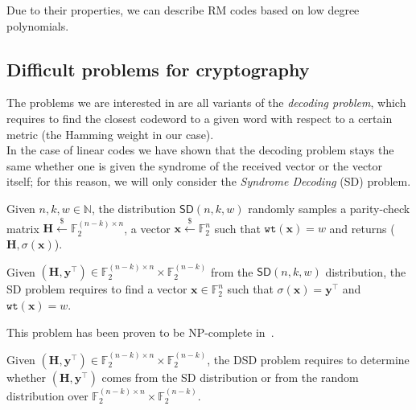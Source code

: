     Due to their properties, we can describe RM codes based on low degree polynomials.\\







\subsection{Difficult problems for cryptography}
The problems we are interested in are all variants of the \textit{decoding problem}, which requires to find 
the closest codeword to a given word with respect to a certain metric (the Hamming weight in our case).\\
In the case of linear codes we have shown that the decoding problem stays the same whether one is given 
the syndrome of the received vector or the vector itself; for this reason, we will only consider 
the \textit{Syndrome Decoding} (\textsf{SD}) problem.\\

\begin{definition}
    Given $n,k,w \in \mathds{N}$, the distribution $\textsf{SD}(n, k, w)$ randomly samples a parity-check matrix 
    $\mathbf{H} \xleftarrow{\mathdollar} \mathds{F}_2^{(n-k)\times n}$, a vector 
    $\mathbf{x} \xleftarrow{\mathdollar} \mathds{F}_2^n$ such that $\texttt{wt}(\mathbf{x}) = w$ 
    and returns ($\mathbf{H}, \sigma(\mathbf{x})$).
\end{definition}

\begin{definition}
    Given $(\mathbf{H}, \mathbf{y}^\top) \in \mathds{F}_2^{(n-k)\times n} \times \mathds{F}_2^{(n-k)}$ from the $\textsf{SD}(n, k, w)$ 
    distribution, the \textsf{SD} problem requires to find a vector $\mathbf{x} \in \mathds{F}_2^n$ such that 
    $\sigma(\mathbf{x}) = \mathbf{y}^\top$ and $\texttt{wt}(\mathbf{x}) = w$.
\end{definition}
This problem has been proven to be NP-complete in~\cite{berlekamp1978inherent}.

\begin{definition}
    Given $(\mathbf{H}, \mathbf{y}^\top) \in \mathds{F}_2^{(n-k)\times n} \times \mathds{F}_2^{(n-k)}$, the \textsf{DSD} problem 
    requires to determine whether $(\mathbf{H}, \mathbf{y}^\top)$ comes from the \textsf{SD} distribution or from the random
    distribution over $\mathds{F}_2^{(n-k)\times n} \times \mathds{F}_2^{(n-k)}$.
\end{definition}


 



